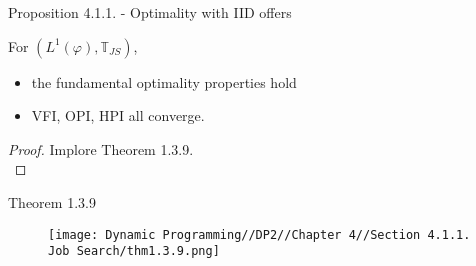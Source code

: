 \documentclass[aspectratio=169]{beamer} %
\begin{document}
\begin{frame}{Proposition 4.1.1. - Optimality with IID offers}
    \begin{theorem}
        For $(L^1(\varphi),\mathbb{T}_{JS})$,
        \begin{itemize}
            \item the fundamental optimality properties hold
            \item VFI, OPI, HPI all converge.
        \end{itemize}
    \end{theorem}

    \begin{proof}
    Implore Theorem 1.3.9.\\
\end{proof}

\end{frame}


\begin{frame}{Theorem 1.3.9}

    \begin{figure}
        \centering
        \texttt{[image: Dynamic Programming//DP2//Chapter 4//Section 4.1.1. Job Search/thm1.3.9.png]}
    \end{figure}


\end{frame}




\end{document}
